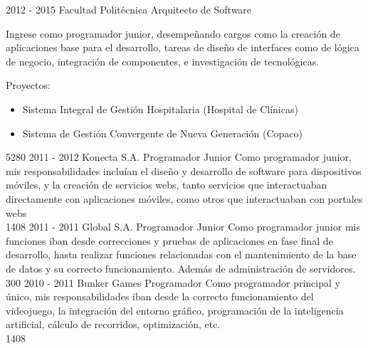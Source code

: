 \documentclass[]{friggeri-cv}
\begin{document}
\begin{entrylist}
{	}
    {}


\entry
    {2012 - 2015}
    {Facultad Politécnica}
    {Arquitecto de Software}
    {Ingrese como programador junior, desempeñando cargos como la creación de
        aplicaciones base para el desarrollo, tareas de diseño de interfaces
        como de lógica de negocio, integración de componentes, e investigación
        de tecnológicas.

        Proyectos:
        \begin{itemize}
            \item Sistema Integral de Gestión Hospitalaria (Hospital de
                Clínicas)
            \item Sistema de Gestión Convergente de Nueva Generación (Copaco)
        \end{itemize}}
    {5280}
\entry
    {2011 - 2012}
    {Konecta S.A.}
    {Programador Junior}
    {Como programador junior, mis responsabilidades incluían el diseño y
        desarrollo de software para dispositivos móviles, y la creación de
        servicios webs, tanto servicios que interactuaban directamente con
        aplicaciones móviles, como otros que interactuaban con portales webs
        \\}
    {1408}
\entry
    {2011 - 2011}
    {Global S.A.}
    {Programador Junior}
    {Como programador junior mis funciones iban desde correcciones y pruebas de
        aplicaciones en fase final de desarrollo, hasta realizar funciones
        relacionadas con el mantenimiento de la base de datos y su correcto
        funcionamiento. Además de administración de servidores. \\}
    {300}
\entry
    {2010 - 2011}
    {Bunker Games}
    {Programador}
    {Como programador principal y único, mis responsabilidades iban desde la
        correcto funcionamiento del videojuego, la integración del entorno
        gráfico, programación de la inteligencia artificial, cálculo de
        recorridos, optimización, etc. \\}
    {1408}

\end{entrylist}
\end{document}
